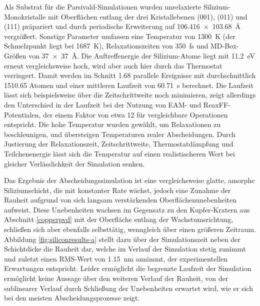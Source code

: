 Als Substrat für die Parsivald-Simulationen wurden unrelaxierte Silizium-Monokristalle mit Oberflächen entlang der drei Kristallebenen (001), (011) und (111) präpariert und durch periodische Erweiterung auf \SI{106.416x103.68}{\angstrom} vergrößert.
Sonstige Parameter umfassen eine Temperatur von \SI{1300}{\kelvin} (der Schmelzpunkt liegt bei \SI{1687}{\kelvin}), Relaxationszeiten von \SI{350}{\femto\second} und MD-Box-Größen von \SI{37x37}{\angstrom}.
Die Auftreffenergie der Silizium-Atome liegt mit \SI{11.2}{\electronvolt} erneut vergleichsweise hoch, wird aber auch hier durch das Thermostat verringert.
Damit werden im Schnitt \num{1.68} parallele Ereignisse mit durchschnittlich \num{1510.65} Atomen und einer mittleren Laufzeit von \SI{60.71}{\second} berechnet.
Die Laufzeit lässt sich beispielsweise über die Zeitschrittweite noch minimieren, zeigt allerdings den Unterschied in der Laufzeit bei der Nutzung von EAM- und ReaxFF-Potentialen, der einem Faktor von etwa \num{12} für vergleichbare Operationen entspricht.
Die hohe Temperatur wurden gewählt, um Relaxationen zu beschleunigen, und übersteigen Temperaturen realer Abscheidungen.
Durch Justierung der Relaxationszeit, Zeitschrittweite, Thermostatdämpfung und Teilchenenergie lässt sich die Temperatur auf einen realistischeren Wert bei gleicher Verlässlichkeit der Simulation senken.

Das Ergebnis der Abscheidungssimulation ist eine vergleichsweise glatte, amorphe Siliziumschicht, die mit konstanter Rate wächst, jedoch eine Zunahme der Rauheit aufgrund von sich langsam verstärkenden Oberflächenunebenheiten aufweist.
Diese Unebenheiten wachsen im Gegensatz zu den Kupfer-Kratern aus Abschnitt \ref{copperpvd} mit der Oberfläche entlang der Wachstumsrichtung, schließen sich aber ebenfalls selbsttätig, wenngleich über einen größeren Zeitraum.
Abbildung \ref{fig:siliconresults-a} stellt dazu über der Simulationszeit neben der Schichtdicke die Rauheit dar, welche im Verlauf der Simulation stetig zunimmt und zuletzt einen RMS-Wert von \SI{1.15}{\nano\meter} annimmt, der experimentellen Erwartungen entspricht.
Leider ermöglicht die begrenzte Laufzeit der Simulation ermöglicht keine Aussage über den weiteren Verlauf der Rauheit, von der sublinearer Verlauf durch Schließung der Unebenheiten erwartet wird, wie er sich bei den meisten Abscheidungsprozesse zeigt.

